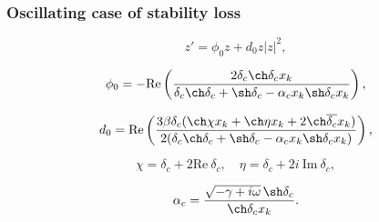 \documentclass[fullscreen=true, unicode, bookmarks=false]{beamer}
\begin{document}
\begin{frame}
\frametitle{ Oscillating case of stability loss }

\begin{equation}
	z' = \phi_0 z + d_0 z |z|^2,
\end{equation}

\bigskip

$$ \phi_0 = -\mbox{Re} \left(\dfrac{2 \delta_c \ch \delta_c x_k}{\delta_c\ch \delta_c + \sh \delta_c - \alpha_c x_k \sh \delta_c x_k} \right), $$

$$ d_0 = \mbox{Re} \left( \dfrac{3 \beta \delta_c (\ch \chi x_k + \ch \eta x_k + 2 \ch \overline{\delta_c} x_k)}{2(\delta_c\ch \delta_c + \sh \delta_c - \alpha_c x_k \sh \delta_c x_k)} \right), $$

\bigskip

$$ \chi = \delta_c + 2\mbox{Re}\:\delta_c, \quad \eta = \delta_c + 2i\:\mbox{Im}\:\delta_c, $$

$$ \alpha_c = \frac{ \sqrt{-\gamma + i \omega} \, \sh \delta_c }{ \ch\delta_c x_k }. $$

\end{frame}
\end{document}
